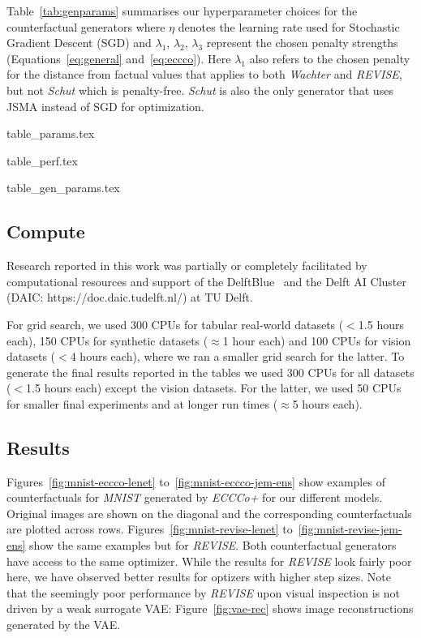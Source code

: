 Table~\ref{tab:genparams} summarises our hyperparameter choices for the counterfactual generators where $\eta$ denotes the learning rate used for Stochastic Gradient Descent (SGD) and $\lambda_1$, $\lambda_2$, $\lambda_3$ represent the chosen penalty strengths (Equations~\ref{eq:general} and~\ref{eq:eccco}). Here $\lambda_1$ also refers to the chosen penalty for the distance from factual values that applies to both \textit{Wachter} and \textit{REVISE}, but not \textit{Schut} which is penalty-free. \textit{Schut} is also the only generator that uses JSMA instead of SGD for optimization.

{table_params.tex}

{table_perf.tex}

{table_gen_params.tex}

\subsection{Compute}

Research reported in this work was partially or completely facilitated by computational resources and support of the DelftBlue~\citep{DHPC2022} and the Delft AI Cluster (DAIC: https://doc.daic.tudelft.nl/) at TU Delft. 

For grid search, we used 300 CPUs for tabular real-world datasets ($<$1.5 hours each), 150 CPUs for synthetic datasets ($\approx$1 hour each) and 100 CPUs for vision datasets ($<$4 hours each), where we ran a smaller grid search for the latter. To generate the final results reported in the tables we used 300 CPUs for all datasets ($<$1.5 hours each) except the vision datasets. For the latter, we used 50 CPUs for smaller final experiments and at longer run times ($\approx$5 hours each).

\subsection{Results}\label{app:results}

Figures~\ref{fig:mnist-eccco-lenet} to~\ref{fig:mnist-eccco-jem-ens} show examples of counterfactuals for \textit{MNIST} generated by \textit{ECCCo+} for our different models. Original images are shown on the diagonal and the corresponding counterfactuals are plotted across rows. Figures~\ref{fig:mnist-revise-lenet} to~\ref{fig:mnist-revise-jem-ens} show the same examples but for \textit{REVISE}. Both counterfactual generators have access to the same optimizer. While the results for \textit{REVISE} look fairly poor here, we have observed better results for optizers with higher step sizes. Note that the seemingly poor performance by \textit{REVISE} upon visual inspection is not driven by a weak surrogate VAE: Figure~\ref{fig:vae-rec} shows image reconstructions generated by the VAE.


